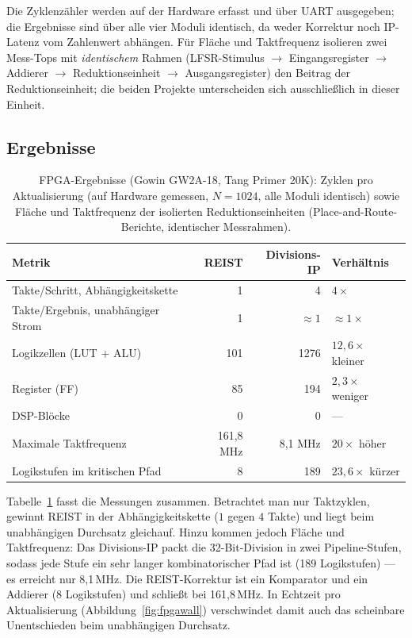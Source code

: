 \documentclass[11pt,a4paper]{scrartcl}
\theoremstyle{definition}
\theoremstyle{plain}
\theoremstyle{remark}
\begin{document}
Die Zyklenzähler werden auf der Hardware erfasst und über UART ausgegeben; die Ergebnisse sind über alle vier Moduli identisch, da weder Korrektur noch IP-Latenz vom Zahlenwert abhängen. Für Fläche und Taktfrequenz isolieren zwei Mess-Tops mit \emph{identischem} Rahmen (LFSR-Stimulus $\to$ Eingangsregister $\to$ Addierer $\to$ Reduktionseinheit $\to$ Ausgangsregister) den Beitrag der Reduktionseinheit; die beiden Projekte unterscheiden sich ausschließlich in dieser Einheit.

\subsection{Ergebnisse}

\begin{table}[htbp]
\centering
\caption{FPGA-Ergebnisse (Gowin GW2A-18, Tang Primer 20K): Zyklen pro Aktualisierung (auf Hardware gemessen, $N = 1024$, alle Moduli identisch) sowie Fläche und Taktfrequenz der isolierten Reduktionseinheiten (Place-and-Route-Berichte, identischer Messrahmen).}
\label{tab:fpga}
\small
\begin{tabular}{lrrl}
\toprule
Metrik & REIST & Divisions-IP & Verhältnis \\
\midrule
Takte/Schritt, Abhängigkeitskette & 1 & 4 & $4\times$ \\
Takte/Ergebnis, unabhängiger Strom & 1 & $\approx 1$ & $\approx 1\times$ \\
\addlinespace
Logikzellen (LUT + ALU) & 101 & 1276 & $12{,}6\times$ kleiner \\
Register (FF) & 85 & 194 & $2{,}3\times$ weniger \\
DSP-Blöcke & 0 & 0 & --- \\
Maximale Taktfrequenz & 161{,}8 MHz & 8{,}1 MHz & $20\times$ höher \\
Logikstufen im kritischen Pfad & 8 & 189 & $23{,}6\times$ kürzer \\
\bottomrule
\end{tabular}
\end{table}

Tabelle~\ref{tab:fpga} fasst die Messungen zusammen. Betrachtet man nur Taktzyklen, gewinnt REIST in der Abhängigkeitskette ($1$ gegen $4$ Takte) und liegt beim unabhängigen Durchsatz gleichauf. Hinzu kommen jedoch Fläche und Taktfrequenz: Das Divisions-IP packt die 32-Bit-Division in zwei Pipeline-Stufen, sodass jede Stufe ein sehr langer kombinatorischer Pfad ist (189 Logikstufen) --- es erreicht nur 8{,}1\,MHz. Die REIST-Korrektur ist ein Komparator und ein Addierer (8 Logikstufen) und schließt bei 161{,}8\,MHz. In Echtzeit pro Aktualisierung (Abbildung~\ref{fig:fpgawall}) verschwindet damit auch das scheinbare Unentschieden beim unabhängigen Durchsatz.
\end{document}
